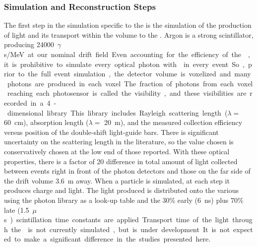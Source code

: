 

\subsubsection{Simulation and Reconstruction Steps} 
\label{subsec:fdsp-pd-simphys-sim}

The first step in the simulation specific to the  is the simulation of the production of light and its transport within the volume to the . Argon is a strong scintillator, producing \SI{24000}{$\gamma$s/MeV} at our nominal drift field. Even accounting for the efficiency of the , it is prohibitive to simulate every optical photon with  in every event. So, prior to the full event simulation, the detector volume is voxelized and many photons are produced in each voxel. The fraction of photons from each voxel reaching each photosensor is called the visibility, and these visibilities are recorded in a 4-dimensional library.
This library includes Rayleigh scattering length ($\lambda=$ \SI{60}{cm}\cite{Grace:2015yta}), absorption length ($\lambda=$ \SI{20}{m}), and the measured collection efficiency versus position of the double-shift light-guide bars. There is significant uncertainty on the scattering length in the literature, so the value chosen is conservatively chosen at the low end of those reported. With these optical properties, there is a factor of 20 difference in total amount of light collected between events right in front of the photon detectors and those on the far side of the drift volume \SI{3.6}{m} away. When a particle is simulated, at each step it produces charge and light. The light produced is distributed onto the various  using the photon library as a look-up table and the 30\% early (\SI{6}{ns}) plus 70\% late (\SI{1.5}{$\mu$s}) scintillation time constants are applied. Transport time of the light through the \lar is not currently simulated, but is under development. It is not expected to make a significant difference in the studies presented here.

